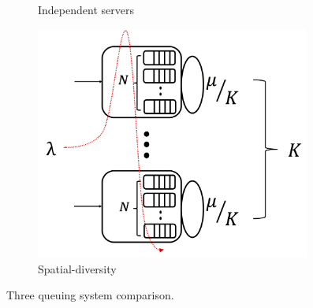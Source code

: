\begin{figure}
\begin{subfigure}[b]{0.3\textwidth}
		\caption{Independent servers}
		\label{fig:enn}
	\end{subfigure}
	\hfill
	\begin{subfigure}[b]{0.3\textwidth}
		\centering
		\includegraphics[width=0.99\textwidth]{ChapterSpatialDiversityFramework/Figures/sdmlfq}
		\caption{Spatial-diversity}
		\label{fig:sdmlfq}
	\end{subfigure}
	\caption{Three queuing system comparison.} %
	\label{fig:three-system-comparison}
\end{figure}

